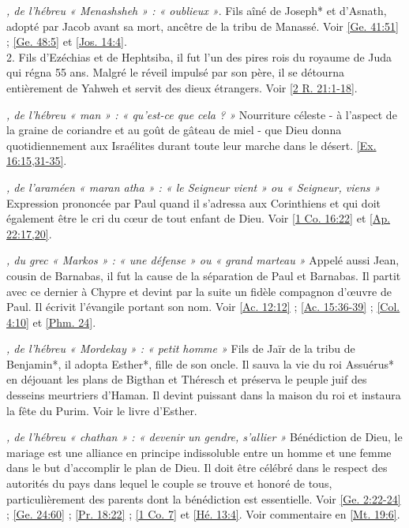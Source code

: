 \begin{multicols}{2}
\textit{, de l'hébreu « Menashsheh » : « oublieux »}. Fils aîné de Joseph* et d'Asnath, adopté par Jacob avant sa mort, ancêtre de la tribu de Manassé. Voir \vref{Ge. 41:51} ; \vref{Ge. 48:5} et \vref{Jos. 14:4}.
\\2. Fils d'Ezéchias et de Hephtsiba, il fut l'un des pires rois du royaume de Juda qui régna 55 ans. Malgré le réveil impulsé par son père, il se détourna entièrement de Yahweh et servit des dieux étrangers. Voir \vref{2 R. 21:1-18}.

\textit{, de l'hébreu « man » : « qu'est-ce que cela ? »}\newline
Nourriture céleste - à l'aspect de la graine de coriandre et au goût de gâteau de miel - que Dieu donna quotidiennement aux Israélites durant toute leur marche dans le désert. \vref{Ex. 16:15,31-35}.

\textit{, de l'araméen « maran atha » : « le Seigneur vient » ou « Seigneur, viens »}\newline
Expression prononcée par Paul quand il s'adressa aux Corinthiens et qui doit également être le cri du cœur de tout enfant de Dieu. Voir \vref{1 Co. 16:22} et \vref{Ap. 22:17,20}.

\textit{, du grec « Markos » : « une défense » ou « grand marteau »}\newline
Appelé aussi Jean, cousin de Barnabas, il fut la cause de la séparation de Paul et Barnabas. Il partit avec ce dernier à Chypre et devint par la suite un fidèle compagnon d'œuvre de Paul. Il écrivit l'évangile portant son nom. Voir \vref{Ac. 12:12} ; \vref{Ac. 15:36-39} ; \vref{Col. 4:10} et \vref{Phm. 24}.

\textit{, de l'hébreu « Mordekay » : « petit homme »}\newline
Fils de Jaïr de la tribu de Benjamin*, il adopta Esther*, fille de son oncle. Il sauva la vie du roi Assuérus* en déjouant les plans de Bigthan et Théresch et préserva le peuple juif des desseins meurtriers d'Haman. Il devint puissant dans la maison du roi et instaura la fête du Purim. Voir le livre d'Esther.

\textit{, de l'hébreu « chathan » : « devenir un gendre, s'allier »}\newline
Bénédiction de Dieu, le mariage est une alliance en principe indissoluble entre un homme et une femme dans le but d'accomplir le plan de Dieu. Il doit être célébré dans le respect des autorités du pays dans lequel le couple se trouve et honoré de tous, particulièrement des parents dont la bénédiction est essentielle. Voir \vref{Ge. 2:22-24} ; \vref{Ge. 24:60} ; \vref{Pr. 18:22} ; \vref{1 Co. 7} et \vref{Hé. 13:4}. Voir commentaire en \vref{Mt. 19:6}.


\end{multicols}
